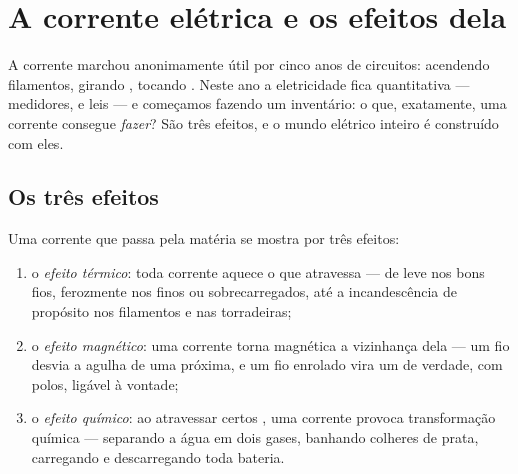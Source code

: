 \chapter{A corrente elétrica e os efeitos dela}\label{ch:g8:electric-current-effects}

A corrente marchou anonimamente útil por cinco anos de circuitos:
acendendo filamentos, girando , tocando . Neste ano
a eletricidade fica quantitativa --- medidores,  e leis --- e
começamos fazendo um inventário: o que, exatamente, uma corrente
consegue \emph{fazer}? São três efeitos, e o mundo elétrico inteiro é
construído com eles.

\section{Os três efeitos}

\begin{proposition}\label{prop:g8:electric-current-effects:three}
Uma corrente que passa pela matéria se mostra por três efeitos:
\begin{enumerate}
  \item o \emph{efeito térmico}: toda corrente
        aquece o  que atravessa --- de leve nos bons fios,
        ferozmente nos finos ou sobrecarregados, até a incandescência
        de propósito nos filamentos e nas torradeiras;
  \item o \emph{efeito magnético}: uma
        corrente torna magnética a vizinhança dela --- um fio desvia
        a agulha de uma  próxima, e um fio enrolado vira um
         de verdade, com polos, ligável à vontade;
  \item o \emph{efeito químico}: ao atravessar
        certos , uma corrente provoca transformação química
        --- separando a água em dois gases, banhando colheres de
        prata, carregando e descarregando toda bateria.
\end{enumerate}
\end{proposition}

